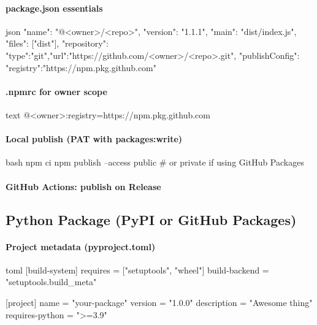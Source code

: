 \documentclass[11pt]{article}
\begin{document}
\paragraph{package.json essentials}
\begin{code}{json}
{
  "name": "@<owner>/<repo>",
  "version": "1.1.1",
  "main": "dist/index.js",
  "files": ["dist"],
  "repository": {"type":"git","url":"https://github.com/<owner>/<repo>.git"},
  "publishConfig": {"registry":"https://npm.pkg.github.com"}
}
\end{code}

\paragraph{.npmrc for owner scope}
\begin{code}{text}
@<owner>:registry=https://npm.pkg.github.com
\end{code}

\paragraph{Local publish (PAT with packages:write)}
\begin{code}{bash}
npm ci
npm publish --access public   # or private if using GitHub Packages
\end{code}

\paragraph{GitHub Actions: publish on Release}

\subsection{Python Package (PyPI or GitHub Packages)}
\paragraph{Project metadata (pyproject.toml)}
\begin{code}{toml}
[build-system]
requires = ["setuptools", "wheel"]
build-backend = "setuptools.build_meta"

[project]
name = "your-package"
version = "1.0.0"
description = "Awesome thing"
requires-python = ">=3.9"
\end{code}
\end{document}
